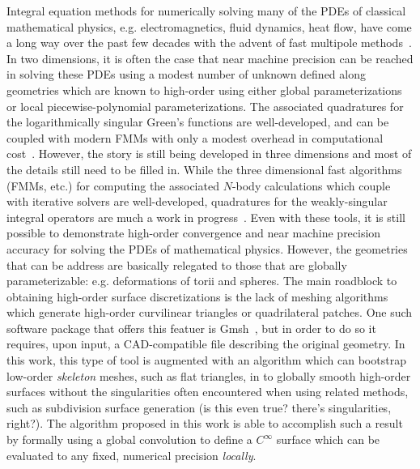 \documentclass[11pt]{article}
\begin{document}
Integral equation methods for numerically solving many of the PDEs of
classical mathematical physics, e.g. electromagnetics, fluid dynamics,
heat flow, have come a long way over the past few decades with the
advent of fast multipole methods~\cite{}. In two dimensions, it is
often the case that near machine precision can be reached in solving
these PDEs using a modest number of unknown defined along geometries
which are known to high-order using either global parameterizations or
local piecewise-polynomial parameterizations. The associated
quadratures for the logarithmically singular Green's functions are
well-developed, and can be coupled with modern FMMs with only a modest
overhead in computational cost~\cite{qbxfmm,etc}. However, the story
is still being developed in three dimensions and most of the details
still need to be filled in.  While the three dimensional fast
algorithms (FMMs, etc.) for computing the associated $N$-body
calculations which couple with iterative solvers are well-developed,
quadratures for the weakly-singular integral operators are much a work
in progress~\cite{qbx3d,bremer,bruno}.  Even with these tools, it is
still possible to demonstrate high-order convergence and near machine
precision accuracy for solving the PDEs of mathematical
physics. However, the geometries that can be address are basically
relegated to those that are globally parameterizable:
e.g. deformations of torii and spheres.  The main roadblock to
obtaining high-order surface discretizations is the lack of meshing
algorithms which generate high-order curvilinear triangles or
quadrilateral patches.  One such software package that offers this
featuer is Gmsh~\cite{gmsh}, but in order to do so it requires, upon
input, a CAD-compatible file describing the original geometry.  In
this work, this type of tool is augmented with an algorithm which
can bootstrap low-order \emph{skeleton} meshes, such as flat
triangles, in to globally smooth high-order surfaces without the
singularities often encountered when using related methods, such as
subdivision surface generation (is this even true? there's
singularities, right?). The algorithm proposed in this work is able to
accomplish such a result by formally using a global convolution to
define a $C^\infty$ surface which can be evaluated to any fixed,
numerical precision \emph{locally}.
\end{document}

